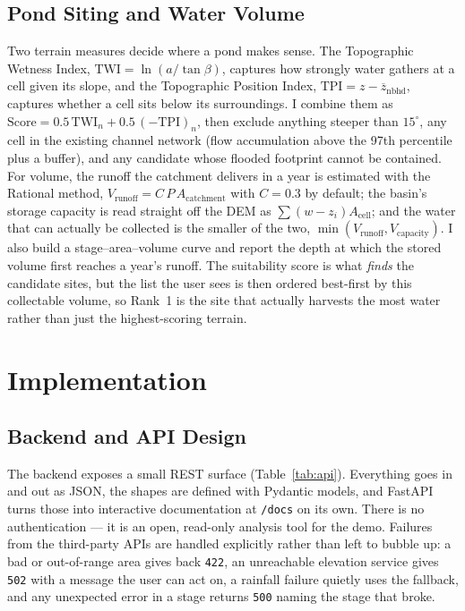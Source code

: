 \documentclass[manuscript,screen]{acmart}
\begin{document}
\subsection{Pond Siting and Water Volume}
Two terrain measures decide where a pond makes sense. The Topographic Wetness Index,
$\text{TWI}=\ln(a/\tan\beta)$, captures how strongly water gathers at a cell given
its slope, and the Topographic Position Index,
$\text{TPI}=z-\overline{z}_{\text{nbhd}}$, captures whether a cell sits below its
surroundings. I combine them as $\text{Score}=0.5\,\text{TWI}_n +
0.5\,(-\text{TPI})_n$, then exclude anything steeper than $15^\circ$, any cell in
the existing channel network (flow accumulation above the 97th percentile plus a
buffer), and any candidate whose flooded footprint cannot be contained. For volume,
the runoff the catchment delivers in a year is estimated with the Rational method,
$V_{\text{runoff}}=C\,P\,A_{\text{catchment}}$ with $C=0.3$ by default; the basin's
storage capacity is read straight off the DEM as $\sum(w-z_i)A_{\text{cell}}$; and
the water that can actually be collected is the smaller of the two,
$\min(V_{\text{runoff}},V_{\text{capacity}})$. I also build a stage--area--volume
curve and report the depth at which the stored volume first reaches a year's runoff.
The suitability score is what \emph{finds} the candidate sites, but the list the user
sees is then ordered best-first by this collectable volume, so Rank~1 is the site
that actually harvests the most water rather than just the highest-scoring terrain.

\section{Implementation}
\label{sec:implementation}

\subsection{Backend and API Design}
The backend exposes a small REST surface (Table~\ref{tab:api}). Everything goes in
and out as JSON, the shapes are defined with Pydantic models, and FastAPI turns
those into interactive documentation at \texttt{/docs} on its own. There is no
authentication --- it is an open, read-only analysis tool for the demo. Failures
from the third-party APIs are handled explicitly rather than left to bubble up: a
bad or out-of-range area gives back \texttt{422}, an unreachable elevation service
gives \texttt{502} with a message the user can act on, a rainfall failure quietly
uses the fallback, and any unexpected error in a stage returns \texttt{500} naming
the stage that broke.
\end{document}
